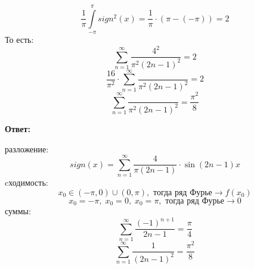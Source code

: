 \documentclass[a4paper,12pt]{article}
\begin{document}
\[
\frac{1}{\pi} \int\limits_{-\pi}^{\pi} sign^2 (x) = \frac{1}{\pi} \cdot (\pi - (-\pi)) = 2 
\]
То есть:
\[
\sum_{n = 1}^{\infty} \frac{4^2}{\pi^2 (2n-1)^2} = 2
\]
\[
\frac{16}{\pi^2} \cdot \sum_{n = 1}^{\infty} \frac{}{\pi^2 (2n-1)^2} = 2
\]
\[
 \sum_{n = 1}^{\infty} \frac{}{\pi^2 (2n-1)^2} = \frac{\pi^2}{8}
\]
\begin{center}
\textbf{Ответ: } 

разложение:
\[
sign(x) = \sum_{n = 1}^{\infty} \frac{4}{\pi(2n - 1)} \cdot \sin(2n -1) x
\]
cходимость:
\[
x_0 \in (-\pi, 0) \cup (0, \pi), \text{ тогда ряд Фурье} \longrightarrow f(x_0)
\]
\[
x_0 = - \pi, \; x_0 = 0, \;  x_0 = \pi, \text{ тогда ряд Фурье} \longrightarrow 0
\]
суммы:
\[
\sum_{n = 1}^{\infty} \frac{(-1)^{n + 1}}{2n-1} = \frac{\pi}{4}
\]
\[
\sum_{n = 1}^{\infty} \frac{1}{(2n-1)^2} = \frac{\pi^2}{8}
\]
\end{center}
\clearpage
\end{document}
